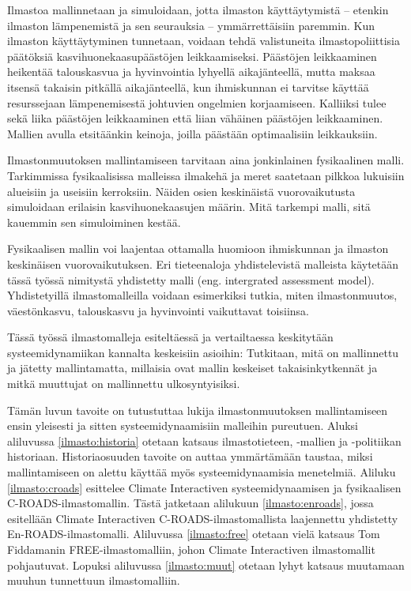 \documentclass[finnish,12pt,a4paper,pdftex]{article}
\begin{document}
\begin{onehalfspacing}
Ilmastoa mallinnetaan ja simuloidaan, jotta ilmaston käyttäytymistä -- etenkin ilmaston lämpenemistä ja sen seurauksia -- ymmärrettäisiin paremmin. Kun ilmaston käyttäytyminen tunnetaan, voidaan tehdä valistuneita ilmastopoliittisia päätöksiä kasvihuonekaasupäästöjen leikkaamiseksi. \cite{CroadsFlightSimulator2011} Päästöjen leikkaaminen heikentää talouskasvua ja hyvinvointia lyhyellä aikajänteellä, mutta maksaa itsensä takaisin pitkällä aikajänteellä, kun ihmiskunnan ei tarvitse käyttää resurssejaan lämpenemisestä johtuvien ongelmien korjaamiseen. Kalliiksi tulee sekä liika päästöjen leikkaaminen että liian vähäinen päästöjen leikkaaminen. Mallien avulla etsitäänkin keinoja, joilla päästään optimaalisiin leikkauksiin. \cite{Fiddaman2002}

Ilmastonmuutoksen mallintamiseen tarvitaan aina jonkinlainen fysikaalinen malli. Tarkimmissa fysikaalisissa malleissa ilmakehä ja meret saatetaan pilkkoa lukuisiin alueisiin ja useisiin kerroksiin. Näiden osien keskinäistä vuorovaikutusta simuloidaan erilaisin kasvihuonekaasujen määrin. Mitä tarkempi malli, sitä kauemmin sen simuloiminen kestää. \cite{CroadsFlightSimulator2011} 

Fysikaalisen mallin voi laajentaa ottamalla huomioon ihmiskunnan ja ilmaston keskinäisen vuorovaikutuksen. Eri tieteenaloja yhdistelevistä malleista käytetään tässä työssä nimitystä yhdistetty malli (eng. intergrated assessment model). Yhdistetyillä ilmastomalleilla voidaan esimerkiksi tutkia, miten ilmastonmuutos, väestönkasvu, talouskasvu ja hyvinvointi vaikuttavat toisiinsa. \cite{U.S.DepartmentofEnergy2009} 

Tässä työssä ilmastomalleja esiteltäessä ja vertailtaessa keskitytään systeemidynamiikan kannalta keskeisiin asioihin: Tutkitaan, mitä on mallinnettu ja jätetty mallintamatta, millaisia ovat mallin keskeiset takaisinkytkennät ja mitkä muuttujat on mallinnettu ulkosyntyisiksi. 

Tämän luvun tavoite on tutustuttaa lukija ilmastonmuutoksen mallintamiseen ensin yleisesti ja sitten systeemidynaamisiin malleihin pureutuen. Aluksi aliluvussa \ref{ilmasto:historia} otetaan katsaus ilmastotieteen, -mallien ja -politiikan historiaan. Historiaosuuden tavoite on auttaa ymmärtämään taustaa, miksi mallintamiseen on alettu käyttää myös systeemidynaamisia menetelmiä. Aliluku \ref{ilmasto:croads} esittelee Climate Interactiven systeemidynaamisen ja fysikaalisen C-ROADS-ilmastomallin. Tästä jatketaan alilukuun \ref{ilmasto:enroads}, jossa esitellään Climate Interactiven C-ROADS-ilmastomallista laajennettu yhdistetty En-ROADS-ilmastomalli. Aliluvussa \ref{ilmasto:free} otetaan vielä katsaus Tom Fiddamanin FREE-ilmastomalliin, johon Climate Interactiven ilmastomallit pohjautuvat. Lopuksi aliluvussa \ref{ilmasto:muut} otetaan lyhyt katsaus muutamaan muuhun tunnettuun ilmastomalliin. 


\end{onehalfspacing}
\end{document}
